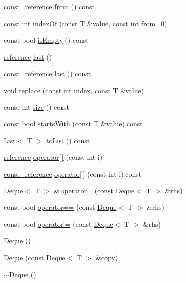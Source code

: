 \begin{DoxyCompactItemize}
\item 
\hyperlink{classprism_1_1_deque_a8fcabfe6976606b91b4abef0e0353584}{const\+\_\+reference} \hyperlink{classprism_1_1_deque_a59a99f0570bfafc33f5b95d40ae06a50}{front} () const 
\item 
const int \hyperlink{classprism_1_1_deque_a1605a58b1afea0d02f0897216322c698}{index\+Of} (const T \&value, const int from=0)
\item 
const bool \hyperlink{classprism_1_1_deque_a848de5d427bfb87099f9992df2ff7596}{is\+Empty} () const 
\item 
\hyperlink{classprism_1_1_deque_a93d8792e719ca205ce1b9ed5d8207c1d}{reference} \hyperlink{classprism_1_1_deque_a9ca3d5be5c2e941af1a14c1383063ae7}{last} ()
\item 
\hyperlink{classprism_1_1_deque_a8fcabfe6976606b91b4abef0e0353584}{const\+\_\+reference} \hyperlink{classprism_1_1_deque_ae9d494c23c0a73603380d44f4e7070e6}{last} () const 
\item 
void \hyperlink{classprism_1_1_deque_a990a2499c18ace8ad27a62f247cc5f01}{replace} (const int index, const T \&value)
\item 
const int \hyperlink{classprism_1_1_deque_a38e141650506c5b320093c5bd5486a8c}{size} () const 
\item 
const bool \hyperlink{classprism_1_1_deque_a4f98d7d14a08511fca808ec0ba5b1060}{starts\+With} (const T \&value) const 
\item 
\hyperlink{classprism_1_1_list}{List}$<$ T $>$ \hyperlink{classprism_1_1_deque_a286993d1186852864d8dbed773e0dbbc}{to\+List} () const 
\item 
\hyperlink{classprism_1_1_deque_a93d8792e719ca205ce1b9ed5d8207c1d}{reference} \hyperlink{classprism_1_1_deque_ad47fd037b004a4f4d466b6333c819010}{operator\mbox{[}$\,$\mbox{]}} (const int i)
\item 
\hyperlink{classprism_1_1_deque_a8fcabfe6976606b91b4abef0e0353584}{const\+\_\+reference} \hyperlink{classprism_1_1_deque_ae821fc4bcdd62b024afbac40b4a67279}{operator\mbox{[}$\,$\mbox{]}} (const int i) const 
\item 
\hyperlink{classprism_1_1_deque}{Deque}$<$ T $>$ \& \hyperlink{classprism_1_1_deque_a248bc973d87dc08e987198ed3f29358e}{operator=} (const \hyperlink{classprism_1_1_deque}{Deque}$<$ T $>$ \&rhs)
\item 
const bool \hyperlink{classprism_1_1_deque_a76d9b447262d0079aa36028c6416f3b8}{operator==} (const \hyperlink{classprism_1_1_deque}{Deque}$<$ T $>$ \&rhs)
\item 
const bool \hyperlink{classprism_1_1_deque_a736fb7c281ec9fb8c1f43b1221c60619}{operator!=} (const \hyperlink{classprism_1_1_deque}{Deque}$<$ T $>$ \&rhs)
\item 
\hyperlink{classprism_1_1_deque_ae8fcffd4a0cf7dba0e33a6983641efc2}{Deque} ()
\item 
\hyperlink{classprism_1_1_deque_abaa7ff51e27ef7acb0ca1afe523e7976}{Deque} (const \hyperlink{classprism_1_1_deque}{Deque}$<$ T $>$ \&\hyperlink{namespaceprism_ae776f4cd825f79e7af1cf6ee1d90a209}{copy})
\item 
\hyperlink{classprism_1_1_deque_a2a06b6247712d843c6f23df8ba807ca7}{$\sim$\+Deque} ()
\end{DoxyCompactItemize}
